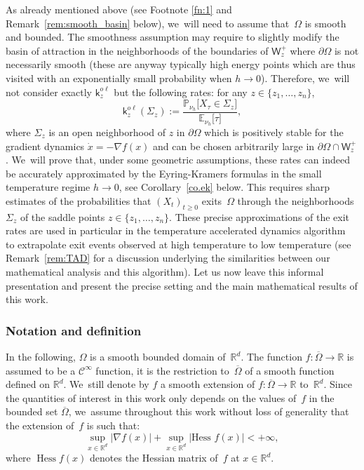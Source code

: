 \documentclass[10pt]{amsart}
\DeclareMathOperator{\hess}{Hess}\let\Hess\hess
\theoremstyle{plain}
\theoremstyle{definition}
\begin{document}
As already mentioned above (see Footnote \eqref{fn:1} and
Remark~\ref{rem:smooth_basin} below), we~will need to assume that~$\Omega$ is
smooth and bounded. The smoothness assumption may require to slightly modify the basin of
attraction in the neighborhoods of the boundaries of $\mathsf W_z^+$ where
$\partial \Omega$ is not necessarily smooth (these are anyway typically high
energy points which are thus visited with an exponentially small
probability when \hbox{$h \to 0$}). Therefore, we~will
not consider exactly $\mathsf k_{z}^{o\ell}$ but the
following rates: for any $z \in \{z_1, \ldots, z_n\}$,
\begin{equation}\label{kijl}
\mathsf k_{z}^{o\ell}(\Sigma_{z}):=\frac{\mathbb P_{\nu_{h}}\big [
X_{\tau} \in \Sigma_{z} \big]}{\mathbb E_{\nu_{h}}\big [ \tau \big]},
\end{equation}
where $\Sigma_{z}$ is an open neighborhood of $z$ in $\partial
\Omega$ which is positively stable for the gradient dynamics $\dot{x}
= -\nabla f(x)$ and can be chosen arbitrarily large in $ \partial \Omega \cap \mathsf W_z^+$. We~will prove that, under
some geometric assumptions, these rates can indeed be accurately approximated by
the Eyring-Kramers formulas in the small temperature regime $h \to 0$, see Corollary~\ref{co.ek} below. This requires sharp estimates of the
probabilities that $(X_t)_{t \ge 0}$ exits~$\Omega$ through the
neighborhoods $\Sigma_z$
of the saddle points $z \in \{z_1, \ldots, z_n\}$. These
precise approximations of the exit rates are used in particular in the
temperature accelerated dynamics algorithm~\cite{sorensen-voter-00} to extrapolate exit events
observed at high temperature to low temperature
(see Remark~\ref{rem:TAD} for a discussion underlying the similarities between our mathematical
analysis and this algorithm). Let us now
leave this informal presentation and present the precise setting and
the main mathematical results of this work.


\subsubsection{Notation and definition}

In the following, $\Omega$ is a smooth bounded domain of~$\mathbb R^d$. The function $f:\overline \Omega\to \mathbb
R$ is assumed to be a $\mathcal C^\infty$ function, \ie it is the restriction
to~$\overline \Omega$ of a smooth function defined on $\mathbb R^d$. We~still
denote by $f$ a smooth extension of $f:\overline \Omega\to \mathbb
R$ to~$\mathbb R^d$. Since the quantities of interest in this work
only depends on the values of~$f$ in the bounded set
$\overline{\Omega}$, we~assume throughout this work without loss of
generality that the extension of~$f$ is such that:
\begin{equation}\label{eq.DB}
\sup_{x\in \mathbb R^d} |\nabla f(x)|+ \sup_{x\in \mathbb R^d} |\text{Hess } f(x)|<+\infty,
\end{equation}
where $\hess f(x)$ denotes the Hessian matrix of~$f$ at $x\in \mathbb R^d$.
\end{document}
